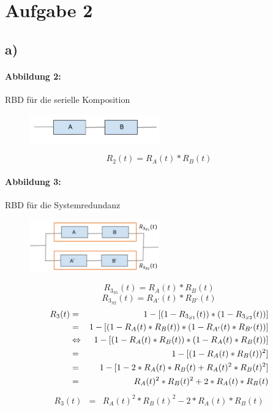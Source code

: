 \section*{Aufgabe 2}

\subsection*{a)}

	\paragraph{Abbildung 2:}
		RBD für die serielle Komposition
		\begin{figure}[h]
			\centering
			\includegraphics[width=0.5\textwidth]{../2/abbildung_2.png}
		\end{figure}
		\begin{equation*}
			R_2(t) = R_A(t) * R_B(t)
		\end{equation*}
	
	\paragraph{Abbildung 3:}
		RBD für die Systemredundanz
		\begin{figure}[h]
			\centering
			\includegraphics[width=0.5\textwidth]{../2/abbildung_3.png}
		\end{figure}
		\begin{equation*}
			R_{3_{S1}}(t) = R_A(t) * R_B(t)
		\end{equation*}
		\begin{equation*}
			R_{3_{S2}}(t) = R_{A'}(t) * R_{B'}(t)
		\end{equation*}
		\begin{eqnarray*}
			R_3(t) &=&				1 - [ (1 - R_{3_{S1}}(t)) * (1 - R_{3_{S2}}(t)) ]
			\cr &=&					1 - [ (1 - R_A(t) * R_B(t)) * (1 - R_{A'}(t) * R_{B'}(t)) ]
			\cr &\Leftrightarrow&	1 - [ (1 - R_A(t) * R_B(t)) * (1 - R_A(t) * R_B(t)) ]
			\cr &=&					1 - [ (1 - R_A(t) * R_B(t))^2 ]
			\cr &=&					1 - [ 1 - 2*R_A(t)*R_B(t) + R_A(t)^2 * R_B(t)^2 ]
			\cr &=&					R_A(t)^2 * R_B(t)^2 + 2*R_A(t)*R_B(t)
		\end{eqnarray*}
		\begin{eqnarray*}
			R_3(t) &=& R_A(t)^2 * R_B(t)^2 - 2*R_A(t)*R_B(t)
		\end{eqnarray*}
	
